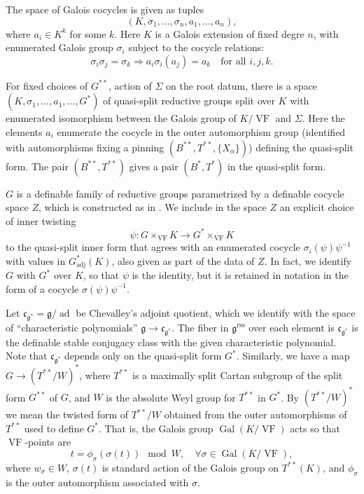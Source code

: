 \documentclass[12pt]{amsart}
\newcommand{\op}[1]{\operatorname{#1}}
\def\VF{{\op{VF}}}
\newcommand{\fg}{\mathfrak{g}}
\newcommand{\fc}{\mathfrak{c}}
\newcommand{\reg}{\mathrm{rss}}
\theoremstyle{plain}
\theoremstyle{definition}
\begin{document}
The space of Galois cocycles is given as tuples
\[
(K,\sigma_1,\ldots,\sigma_n,a_1,\ldots,a_n),
\]
where $a_i \in K^k$ for some $k$.  Here $K$ is a Galois extension of fixed degre $n$, with
enumerated Galois group $\sigma_i$ subject to the cocycle relations:
\[
\sigma_i \sigma_j 
  = \sigma_k \Longrightarrow a_i \sigma_i(a_j) 
  = a_k\quad\text{for all } i,j,k.
\]

For fixed choices of $G^{**}$, action of $\Sigma$ on the root datum,
there is a space $(K,\sigma_1,\ldots,a_1,\ldots,G^*)$ of
quasi-split reductive groups split over $K$ with enumerated
isomorphism between the Galois group of $K/\VF$ and $\Sigma$.  Here
the elements $a_i$ enumerate the cocycle in the outer
automorphism group (identified with automorphisms fixing a pinning
$(B^{**},T^{**},\{X_\alpha\})$) defining the quasi-split form.  The
pair $(B^{**},T^{**})$ gives a pair $(B^*,T^*)$ in the quasi-split
form.

$G$ is a definable family of reductive groups parametrized by a
definable cocycle space $Z$, which is constructed as in \cite{CGH}.  We
include in the space $Z$ an explicit choice of inner twisting 
\[
\psi:G
\times_\VF K \to G^*\times_\VF K
\] to the quasi-split inner form that agrees with an enumerated
cocycle $\sigma_i(\psi) \psi^{-1}$ with values in $G^*_{\op{adj}}(K)$, also
given as part of the data of $Z$.  In fact, we identify $G$ with $G^*$
over $K$, so that $\psi$ is the identity, but it is retained in
notation in the form of a cocycle $\sigma(\psi)\psi^{-1}$.  

Let $\fc_{\fg^{*}} = \fg/\op{ad}$ be Chevalley's adjoint quotient, which
we identify with the space of ``characteristic polynomials'' $\fg\to
\fc_{\fg^{*}}$.  The fiber in $\fg^\reg$ over each element is
$\fc_{\fg^{*}}$ is the definable stable conjugacy class with the given
characteristic polynomial.  Note that $\fc_{\fg^{*}}$ depends only on
the quasi-split form $G^*$. Similarly, we have a map $G\to (T^{**}/W)^*$,
where $T^{**}$ is a maximally split Cartan subgroup of the split
form $G^{**}$ of $G$, and $W$ is the absolute Weyl group for $T^{**}$
in $G^*$.  By $(T^{**}/W)^*$ we mean the twisted form of $T^{**}/W$
obtained from the outer automorphisms of $T^{**}$ used to define
$G^*$.  That is, the Galois group $\op{Gal}(K/\VF)$ acts so that
$\VF$-points are
\[
t =  \phi_\sigma(\sigma(t))\mod W, \quad\forall \sigma\in\op{Gal}(K/\VF),
\]
where $w_\sigma\in W$, $\sigma(t)$ is standard action of the Galois
group on $T^{**}(K)$, and $\phi_\sigma$ is the outer automorphism
associated with $\sigma$.
\end{document}
